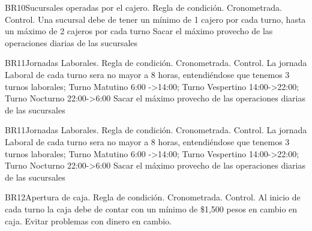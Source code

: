 \begin{BussinesRule}{BR10}{Sucursales operadas por el cajero.}
	\BRitem[Tipo:] Regla de condición. 
	\BRitem[Clase:] Cronometrada. 
	\BRitem[Nivel:] Control. %
	\BRitem[Descripción:] Una sucursal debe de tener un mínimo de 1 cajero por cada turno, hasta un máximo de 2 cajeros por cada turno
	\BRitem[Motivación:] Sacar el máximo provecho de las operaciones diarias de las sucursales 
\end{BussinesRule}

\begin{BussinesRule}{BR11}{Jornadas Laborales.}
	\BRitem[Tipo:] Regla de condición. 
	\BRitem[Clase:] Cronometrada. 
	\BRitem[Nivel:] Control. %
	\BRitem[Descripción:] La jornada Laboral de cada turno sera no mayor a 8 horas, entendiéndose que tenemos 3 turnos laborales; Turno Matutino 6:00 ->14:00; Turno Vespertino 14:00->22:00; Turno Nocturno 22:00->6:00
	\BRitem[Motivación:] Sacar el máximo provecho de las operaciones diarias de las sucursales 
\end{BussinesRule}


\begin{BussinesRule}{BR11}{Jornadas Laborales.}
	\BRitem[Tipo:] Regla de condición. 
	\BRitem[Clase:] Cronometrada. 
	\BRitem[Nivel:] Control. %
	\BRitem[Descripción:] La jornada Laboral de cada turno sera no mayor a 8 horas, entendiéndose que tenemos 3 turnos laborales; Turno Matutino 6:00 ->14:00; Turno Vespertino 14:00->22:00; Turno Nocturno 22:00->6:00
	\BRitem[Motivación:] Sacar el máximo provecho de las operaciones diarias de las sucursales 
\end{BussinesRule}


\begin{BussinesRule}{BR12}{Apertura de caja.}
	\BRitem[Tipo:] Regla de condición. 
	\BRitem[Clase:] Cronometrada. 
	\BRitem[Nivel:] Control. %
	\BRitem[Descripción:] Al inicio de cada turno la caja debe de contar con un mínimo de \$1,500 pesos en cambio en caja.
	\BRitem[Motivación:] Evitar problemas con dinero en cambio.
\end{BussinesRule}



